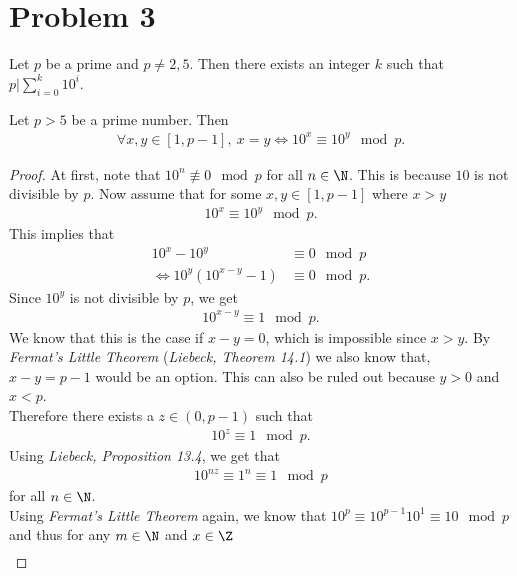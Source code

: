 \documentclass{article}
\begin{document}
\section*{Problem 3}
\begin{claim}
  Let $p$ be a prime and $p\not=2,5$. Then there exists an integer $k$ such that $p|\sum_{i=0}^k 10^i$.
\end{claim}
\begin{adjustwidth}{2em}{2em}
  \begin{lemma}
    \label{l2}
    Let $p>5$ be a prime number. Then
    \begin{align*}
      \forall x,y\in[1,p-1],\: x=y \Leftrightarrow 10^x\equiv 10^y\mod p.
    \end{align*}
  \end{lemma}
  \begin{proof}
    At first, note that $10^n \not\equiv 0 \mod p$ for all $n\in\N$.
    This is because $10$ is not divisible by $p$.
    Now assume that for some $x,y\in[1,p-1]$ where $x>y$
    \begin{align*}
      10^x \equiv 10^y \mod p.
    \end{align*}
    This implies that
    \begin{align*}
      10^x-10^y                        & \equiv 0\mod p   \\
      \Leftrightarrow 10^y(10^{x-y}-1) & \equiv 0 \mod p.
    \end{align*}
    Since $10^y$ is not divisible by $p$, we get
    \begin{align*}
      10^{x-y}\equiv 1 \mod p.
    \end{align*}
    We know that this is the case if $x-y=0$, which is impossible since $x>y$.
    By \emph{Fermat's Little Theorem} (\emph{Liebeck, Theorem 14.1}) we also know that, $x-y=p-1$ would be an option.
    This can also be ruled out because $y>0$ and $x<p$.\\
    Therefore there exists a $z\in(0,p-1)$ such that
    \begin{align*}
      10^z \equiv 1 \mod p.
    \end{align*}
    Using \emph{Liebeck, Proposition 13.4}, we get that
    \begin{align*}
      10^{nz}\equiv 1^n\equiv 1 \mod p
    \end{align*}
    for all $n\in\N$. \\
    Using \emph{Fermat's Little Theorem} again, we know that $10^p\equiv 10^{p-1}10^1\equiv 10\mod p$ and thus for any $m\in\N$ and $x\in\Z$
    \begin{align*}

\end{align*}
\end{proof}
\end{adjustwidth}
\end{document}
